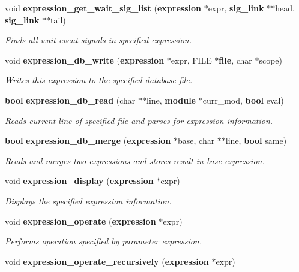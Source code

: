 \begin{CompactItemize}
void {\bf expression\_\-get\_\-wait\_\-sig\_\-list} ({\bf expression} $\ast$expr, {\bf sig\_\-link} $\ast$$\ast$head, {\bf sig\_\-link} $\ast$$\ast$tail)
\begin{CompactList}\small\item\em Finds all wait event signals in specified expression. \item\end{CompactList}\item 
void {\bf expression\_\-db\_\-write} ({\bf expression} $\ast$expr, FILE $\ast${\bf file}, char $\ast$scope)
\begin{CompactList}\small\item\em Writes this expression to the specified database file. \item\end{CompactList}\item 
{\bf bool} {\bf expression\_\-db\_\-read} (char $\ast$$\ast$line, {\bf module} $\ast$curr\_\-mod, {\bf bool} eval)
\begin{CompactList}\small\item\em Reads current line of specified file and parses for expression information. \item\end{CompactList}\item 
{\bf bool} {\bf expression\_\-db\_\-merge} ({\bf expression} $\ast$base, char $\ast$$\ast$line, {\bf bool} same)
\begin{CompactList}\small\item\em Reads and merges two expressions and stores result in base expression. \item\end{CompactList}\item 
void {\bf expression\_\-display} ({\bf expression} $\ast$expr)
\begin{CompactList}\small\item\em Displays the specified expression information. \item\end{CompactList}\item 
void {\bf expression\_\-operate} ({\bf expression} $\ast$expr)
\begin{CompactList}\small\item\em Performs operation specified by parameter expression. \item\end{CompactList}\item 
void {\bf expression\_\-operate\_\-recursively} ({\bf expression} $\ast$expr)

\end{CompactItemize}
